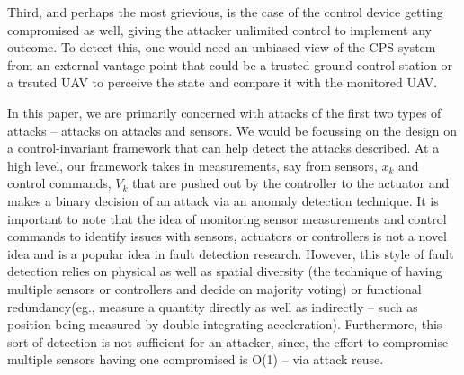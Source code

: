 Third, and perhaps the most grievious, is the case of the control device getting compromised as well, giving the attacker unlimited control to implement any outcome. To detect this, one would need an unbiased view of the CPS system from an external vantage point that could be a trusted ground control station or a trsuted UAV to perceive the state and compare it with the monitored UAV. 

In this paper, we are primarily concerned with attacks of the first two types of attacks -- attacks on attacks and sensors. We would be focussing on the design on a control-invariant framework that can help detect the attacks described. At a high level, our framework takes in measurements, say from sensors, $x_k$ and control commands, $V_k$  that are pushed out by the controller to the actuator and makes a binary decision of an attack via an anomaly detection technique. It is important to note that the idea of monitoring sensor measurements and control commands to identify issues with sensors, actuators or controllers is not a novel idea and is a popular idea in fault detection research. However, this style of fault detection relies on physical as well as spatial diversity (the technique of having multiple sensors or controllers and decide on majority voting) or functional redundancy(eg., measure a quantity directly as well as indirectly -- such as position being measured by double integrating acceleration). Furthermore, this sort of detection is not sufficient for an attacker, since, the effort to compromise multiple sensors having one compromised is O(1) -- via attack reuse.


